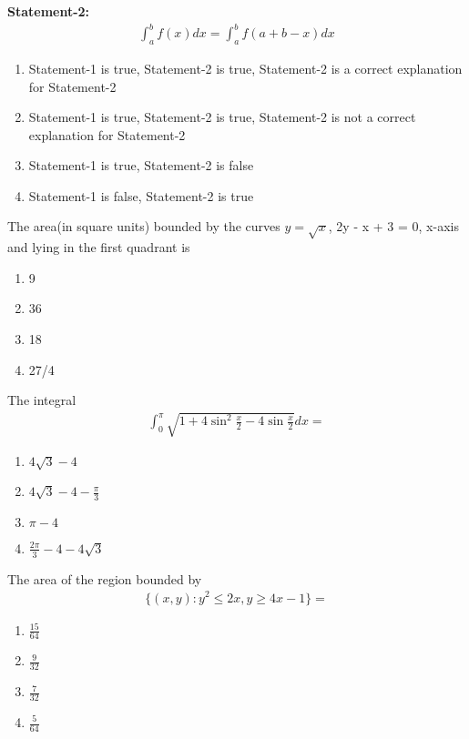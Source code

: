 \textbf{Statement-2:} 
\begin{align*}
\int_{a}^{b}f(x)dx = \int_{a}^{b}f(a + b -x)dx
\end{align*}
\begin{enumerate}
\item Statement-1 is true, Statement-2 is true, Statement-2 is a correct explanation for Statement-2
\item Statement-1 is true, Statement-2 is true, Statement-2 is not a correct explanation for Statement-2
\item Statement-1 is true, Statement-2 is false
\item Statement-1 is false, Statement-2 is true
\end{enumerate}

\item The area(in square units) bounded by the curves $y = \sqrt{x}$, 2y - x + 3 = 0, x-axis and lying in the first quadrant is
\begin{enumerate}
\item 9
\item 36
\item 18
\item 27/4
\end{enumerate}

\item The integral
\begin{align*}
\int_{0}^{\pi}\sqrt{1 + 4\sin^{2}\frac{x}{2} - 4\sin\frac{x}{2}}dx = 
\end{align*}
\begin{enumerate}
\item $4\sqrt{3} - 4$
\item $4\sqrt{3} - 4 - \frac{\pi}{3}$
\item $\pi - 4$
\item $\frac{2\pi}{3} - 4 - 4\sqrt{3}$
\end{enumerate}

\item The area of the region bounded by 
\begin{align*}
\{(x, y): y^2 \leq 2x, y \geq 4x - 1\} = 
\end{align*}
\begin{enumerate}
\item $\frac{15}{64}$
\item $\frac{9}{32}$
\item $\frac{7}{32}$
\item $\frac{5}{64}$
\end{enumerate}

